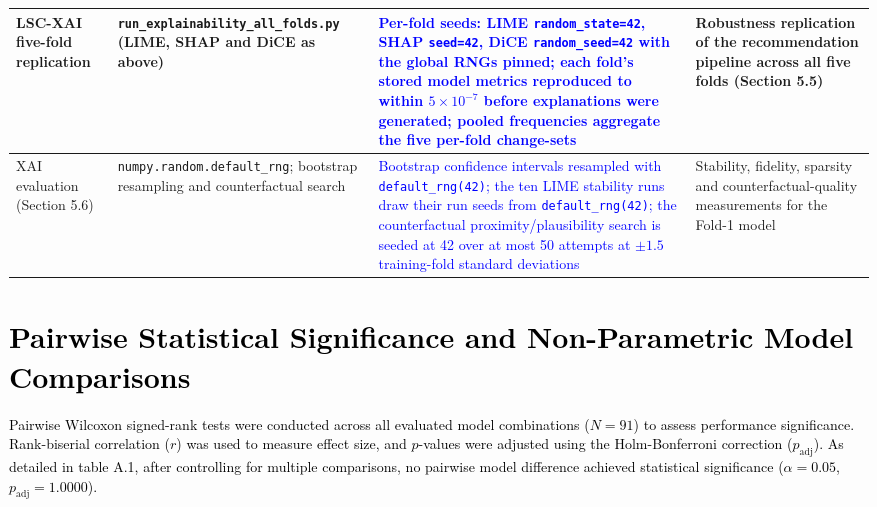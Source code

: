 \documentclass[a4paper,fleqn]{cas-sc}
\begin{document}
\begin{longtable}{p{2cm} p{7.75cm} p{3cm} p{2.25cm}}
LSC-XAI five-fold replication
& \texttt{run\_explainability\_all\_folds.py} (LIME, SHAP and DiCE as above)
& \textcolor{blue}{Per-fold seeds: LIME \texttt{random\_state=42}, SHAP \texttt{seed=42}, DiCE \texttt{random\_seed=42} with the global RNGs pinned; each fold's stored model metrics reproduced to within $5\times10^{-7}$ before explanations were generated; pooled frequencies aggregate the five per-fold change-sets}
& Robustness replication of the recommendation pipeline across all five folds (Section 5.5) \\
\midrule

XAI evaluation (Section 5.6)
& \texttt{numpy.random.default\_rng}; bootstrap resampling and counterfactual search
& \textcolor{blue}{Bootstrap confidence intervals resampled with \texttt{default\_rng(42)}; the ten LIME stability runs draw their run seeds from \texttt{default\_rng(42)}; the counterfactual proximity/plausibility search is seeded at 42 over at most 50 attempts at $\pm 1.5$ training-fold standard deviations}
& Stability, fidelity, sparsity and counterfactual-quality measurements for the Fold-1 model \\

\end{longtable}

\newpage

\section{\textcolor{black}{Pairwise Statistical Significance and Non-Parametric Model Comparisons}}
\label{app:pairwise_statistical}
\textcolor{black}{Pairwise Wilcoxon signed-rank tests were conducted across all evaluated model combinations ($N = 91$) to assess performance significance. Rank-biserial correlation ($r$) was used to measure effect size, and $p$-values were adjusted using the Holm-Bonferroni correction ($p_{\text{adj}}$). As detailed in table A.1, after controlling for multiple comparisons, no pairwise model difference achieved statistical significance ($\alpha = 0.05$, $p_{\text{adj}} = 1.0000$).}
\begingroup
\captionsetup[longtable]{justification=raggedright, singlelinecheck=false}
\small
\end{document}
